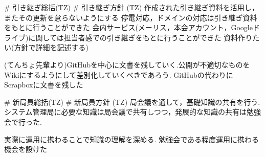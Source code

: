 # 引き継ぎ総括(TZ)
# 引き継ぎ方針 (TZ)
作成された引き継ぎ資料を活用し，またその更新を怠らないようにする
停電対応，ドメインの対応は引き継ぎ資料をもとに行うことができた
会内サービス(メーリス，本会アカウント，Googleドライブ)に関しては担当者感での引き継ぎをもとに行うことができた
資料作りたい(方針で詳細を記述する)

(てんちょ先輩より)GitHubを中心に文書を残していく.公開が不適切なものをWikiにするようにして差別化していくべきであろう.
GitHubの代わりにScrapboxに文書を残した

# 新局員総括(TZ)
# 新局員方針 (TZ)
局会議を通して，基礎知識の共有を行う.
システム管理局に必要な知識は局会議で共有しつつ，発展的な知識の共有は勉強会で行った.

実際に運用に携わることで知識の理解を深める.
勉強会である程度運用に携わる機会を設けた


